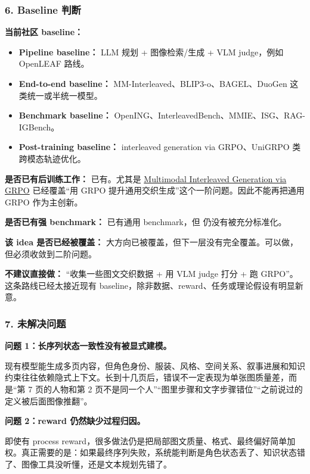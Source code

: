 \subsubsection*{6. Baseline 判断}

\textbf{当前社区 baseline：}

\begin{itemize}[leftmargin=1.5em]
  \item \textbf{Pipeline baseline：} LLM 规划 + 图像检索/生成 + VLM judge，例如 OpenLEAF 路线。
  \item \textbf{End-to-end baseline：} MM-Interleaved、BLIP3-o、BAGEL、DuoGen 这类统一或半统一模型。
  \item \textbf{Benchmark baseline：} OpenING、InterleavedBench、MMIE、ISG、RAG-IGBench。
  \item \textbf{Post-training baseline：} interleaved generation via GRPO、UniGRPO 类跨模态轨迹优化。
\end{itemize}

\textbf{是否已有后训练工作：} 已有。尤其是 \href{https://arxiv.org/abs/2603.09538}{Multimodal Interleaved Generation via GRPO} 已经覆盖“用 GRPO 提升通用交织生成”这个一阶问题。因此不能再把通用 GRPO 作为主创新。

\textbf{是否已有强 benchmark：} 已有通用 benchmark，但  仍没有被充分标准化。

\textbf{该 idea 是否已经被覆盖：} 大方向已被覆盖，但下一层没有完全覆盖。可以做，但必须收敛到二阶问题。

\begin{warnbox}
\textbf{不建议直接做：} “收集一些图文交织数据 + 用 VLM judge 打分 + 跑 GRPO”。这条路线已经太接近现有 baseline，除非数据、reward、任务或理论假设有明显新意。
\end{warnbox}

\subsubsection*{7. 未解决问题}

\textbf{问题 1：长序列状态一致性没有被显式建模。}

现有模型能生成多页内容，但角色身份、服装、风格、空间关系、叙事进展和知识约束往往依赖隐式上下文。长到十几页后，错误不一定表现为单张图质量差，而是“第 7 页的人物和第 2 页不是同一个人”“图里步骤和文字步骤错位”“之前说过的定义被后面图像推翻”。

\textbf{问题 2：reward 仍然缺少过程归因。}

即使有 process reward，很多做法仍是把局部图文质量、格式、最终偏好简单加权。真正需要的是：如果最终序列失败，系统能判断是角色状态丢了、知识状态错了、图像工具没听懂，还是文本规划先错了。

